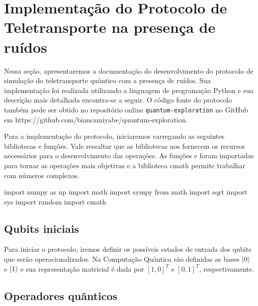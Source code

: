 
\chapter{Implementação do Protocolo de Teletransporte na presença de ruídos}\label{app:protocolo}

Nessa seção, apresentaremos a documentação do desenvolvimento do protocolo de simulação do teletransporte quântico com a presença de ruídos. Sua implementação foi realizada utilizando a linguagem de programação Python e sua descrição mais detalhada encontra-se a seguir. O código fonte do protocolo também pode ser obtido no repositório online \texttt{quantum-exploration} no GitHub em \hypertarget{repositório}{https://github.com/biancamiyabe/quantum-exploration}.

Para a implementação do protocolo, iniciaremos carregando as seguintes bibliotecas e funções. Vale ressaltar que as bibliotecas nos fornecem os recursos necessários para o desenvolvimento das operações. As funções  e  foram importadas para tornar as operações mais objetivas e a biblioteca cmath permite trabalhar com números complexos.
\begin{pycode}
    import numpy as np
    import math
    import sympy
    from math import sqrt
    import sys
    import random
    import cmath
\end{pycode}

\section{Qubits iniciais}\label{qubits-iniciais}

Para iniciar o protocolo, iremos definir os possíveis estados de entrada dos qubits que serão operacionalizados. Na Computação Quântica são definidas as bases \(\ket{0}\) e \(\ket{1}\) e sua representação matricial é dada por \([1, 0]^{T}\) e \([0, 1]^{T}\), respectivamente.

\section{Operadores quânticos}\label{operadores-quuxe2nticos}

